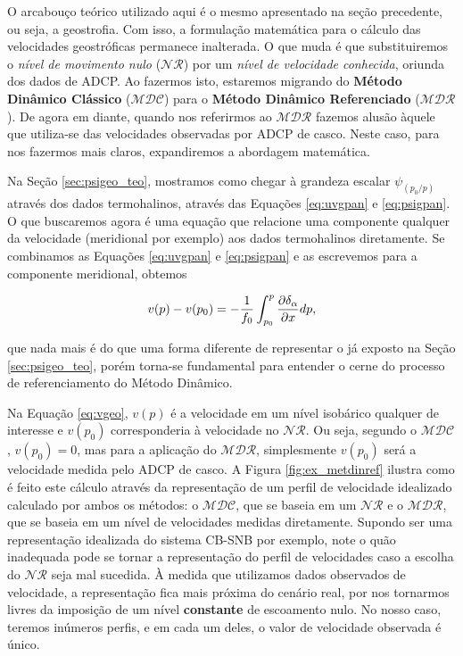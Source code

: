 \hspace{6mm} O arcabouço teórico utilizado aqui é o mesmo apresentado na seção precedente, ou seja, a geostrofia. 
Com isso, a formulação matemática para o cálculo das velocidades geostróficas permanece
inalterada. O que muda é que substituiremos o {\it nível de movimento nulo} ($\mathcal{NR}$) por um {\it nível de velocidade
conhecida}, oriunda dos dados de ADCP. Ao fazermos isto, estaremos migrando do {\bf Método Dinâmico Clássico} ($\mathcal{MDC}$) para 
o {\bf Método Dinâmico Referenciado} ($\mathcal{MDR}$). De agora em diante, quando nos referirmos ao $\mathcal{MDR}$
fazemos alusão àquele que utiliza-se das velocidades observadas por ADCP de casco. Neste caso, para nos fazermos mais claros, expandiremos a abordagem 
matemática. 

Na Seção \ref{sec:psigeo_teo}, mostramos como chegar à grandeza escalar $\psi_{(p_0/p)}$ através dos 
dados termohalinos, através das Equações \ref{eq:uvgpan} e \ref{eq:psigpan}. O que buscaremos agora
é uma equação que relacione uma componente qualquer da velocidade (meridional por exemplo) aos dados
termohalinos diretamente. Se combinamos as Equações \ref{eq:uvgpan} e \ref{eq:psigpan} e as escrevemos para  
a componente meridional, obtemos 

\begin{equation}
v(p) - v(p_0) = - \frac{1}{f_0} \int_{p_0}^p \frac{\partial \delta_\alpha}{\partial x} dp,
\vspace{0.5cm}
\label{eq:vgeo}
\end{equation}

que nada mais é do que uma forma diferente de representar o já exposto na Seção \ref{sec:psigeo_teo}, 
porém torna-se fundamental para entender o cerne do processo de referenciamento do Método Dinâmico. 

Na Equação \ref{eq:vgeo}, $v(p)$ é a velocidade em um nível isobárico qualquer de interesse e $v(p_0)$ corresponderia à 
velocidade no $\mathcal{NR}$. Ou seja, segundo o $\mathcal{MDC}$, $v(p_0) = 0$, mas para a aplicação do $\mathcal{MDR}$, simplesmente
$v(p_0)$ será a velocidade medida pelo ADCP de casco. A Figura \ref{fig:ex_metdinref} ilustra como é feito este cálculo
através da representação de um perfil de velocidade idealizado calculado por ambos os métodos: o $\mathcal{MDC}$, 
que se baseia em um $\mathcal{NR}$ e o $\mathcal{MDR}$, que se baseia em um nível de 
velocidades medidas diretamente. Supondo ser uma representação idealizada do sistema CB-SNB por exemplo, note
o quão inadequada pode se tornar a representação do perfil de velocidades caso a escolha do $\mathcal{NR}$ seja mal sucedida. 
À medida que utilizamos dados observados de velocidade, a representação fica mais próxima do cenário real, por nos
tornarmos livres da imposição de um nível {\bf constante} de escoamento nulo. No nosso caso, teremos inúmeros perfis, 
e em cada um deles, o valor de velocidade observada é único.


